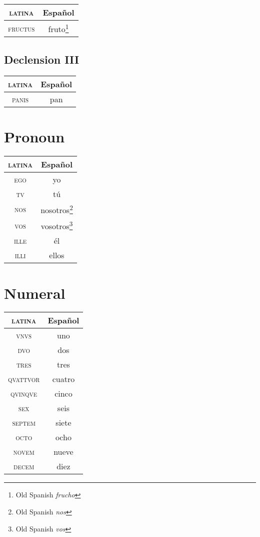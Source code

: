 \documentclass{report}
\begin{document}
\begin{tabular}{|c|c|}
  \hline
  \textsc{latina} & Español \\
  \hline
  \textsc{fructus} & fruto\footnote{Old Spanish \emph{frucho}} \\
  \hline
\end{tabular}

\subsection{Declension III}

\begin{tabular}{|c|c|}
  \hline
  \textsc{latina} & Español \\
  \hline
  \textsc{panis} & pan \\
  \hline
\end{tabular}

\section{Pronoun}

\begin{tabular}{|c|c|}
  \hline
  \textsc{latina} & Español \\
  \hline
  \textsc{ego} & yo \\
  \hline
  \textsc{tv} & tú \\
  \hline
  \textsc{nos} & nosotros\footnote{Old Spanish \emph{nos}} \\
  \hline
  \textsc{vos} & vosotros\footnote{Old Spanish \emph{vos}} \\
  \hline
  \textsc{ille} & él \\
  \hline
  \textsc{illi} & ellos \\
  \hline
\end{tabular}

\section{Numeral}

\begin{tabular}{|c|c|}
  \hline
  \textsc{latina} & Español \\
  \hline
  \textsc{vnvs} & uno \\
  \hline
  \textsc{dvo} & dos \\
  \hline
  \textsc{tres} & tres \\
  \hline
  \textsc{qvattvor} & cuatro \\
  \hline
  \textsc{qvinqve} & cinco \\
  \hline
  \textsc{sex} & seis \\
  \hline
  \textsc{septem} & siete \\
  \hline
  \textsc{octo} & ocho \\
  \hline
  \textsc{novem} & nueve \\
  \hline
  \textsc{decem} & diez \\
  \hline
\end{tabular}
\end{document}
